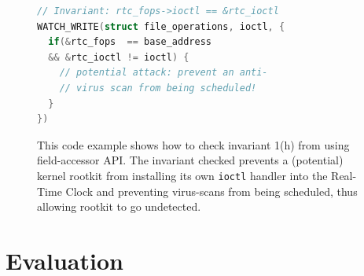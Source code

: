 \documentclass[letterpaper,twocolumn,10pt]{article}
\begin{document}
\begin{figure}[t]
\begin{lstlisting}[language=C,basicstyle=\footnotesize\ttfamily]
// Invariant: rtc_fops->ioctl == &rtc_ioctl
WATCH_WRITE(struct file_operations, ioctl, {
  if(&rtc_fops  == base_address
  && &rtc_ioctl != ioctl) {
    // potential attack: prevent an anti-
    // virus scan from being scheduled!
  }
})
\end{lstlisting}
\vspace{-8pt}
\caption{\label{fig:field_invariant_check}This code example shows how to check invariant 1(h) from \cite{GibraltarKernelInvariants} using field-accessor API. The invariant checked prevents a (potential) kernel rootkit from installing its own \texttt{ioctl} handler into the Real-Time Clock and preventing virus-scans from being scheduled, thus allowing rootkit to go undetected.}
\end{figure}


\section{Evaluation}
\end{document}
